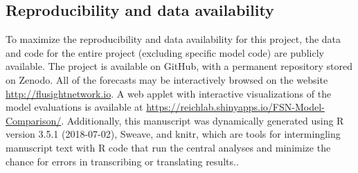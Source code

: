 \documentclass[9pt,twocolumn,twoside]{pnas-new}\usepackage[]{graphicx}\usepackage[]{color}
\begin{document}
{\subsection*{Reproducibility and data availability}

To maximize the reproducibility and data availability for this project, the data and code for the entire project (excluding specific model code) are publicly available.
The project is available on GitHub\cite{fsngithub2018}, with a permanent repository stored on Zenodo\cite{fsnzenodo2018}.
All of the forecasts may be interactively browsed on the website \url{http://flusightnetwork.io}.
A web applet with interactive visualizations of the model evaluations is available at \url{https://reichlab.shinyapps.io/FSN-Model-Comparison/}. 
Additionally, this manuscript was dynamically generated using R version 3.5.1 (2018-07-02), Sweave, and knitr, which are tools for intermingling manuscript text with R code that run the central analyses and minimize the chance for errors in transcribing or translating results.\cite{Xie2015,RCore2017}.

}

\showmatmethods{}


\showacknow{}



\end{document}
